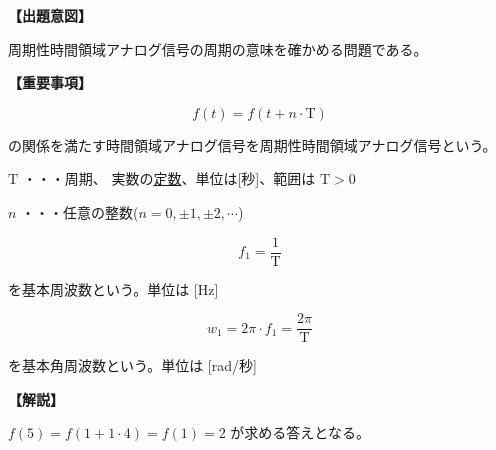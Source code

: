 \noindent \textbf{【出題意図】}

\noindent 周期性時間領域アナログ信号の周期の意味を確かめる問題である。

\vspace{1em}
\noindent \textbf{【重要事項】}

\[
f(t) = f(t + n \cdot \textrm{T})
\]

\noindent の関係を満たす時間領域アナログ信号を周期性時間領域アナログ信号という。

\medskip
\noindent $\textrm{T}$ ・・・周期、 実数の\underline{定数}、単位は[秒]、範囲は $\textrm{T} > 0$

\medskip
\noindent $n$ ・・・任意の整数($n = 0,\pm1,\pm2,\cdots$)

\[
f_1 = \frac{1}{\textrm{T}}
\]

\noindent を基本周波数という。単位は [Hz]

\[
w_1 = 2\pi \cdot f_1 = \frac{2\pi}{\textrm{T}}
\]

\noindent を基本角周波数という。単位は [rad/秒] 


\vspace{1em}
\noindent \textbf{【解説】}

\noindent $f(5) = f(1 + 1 \cdot 4) = f(1) = 2$ が求める答えとなる。
